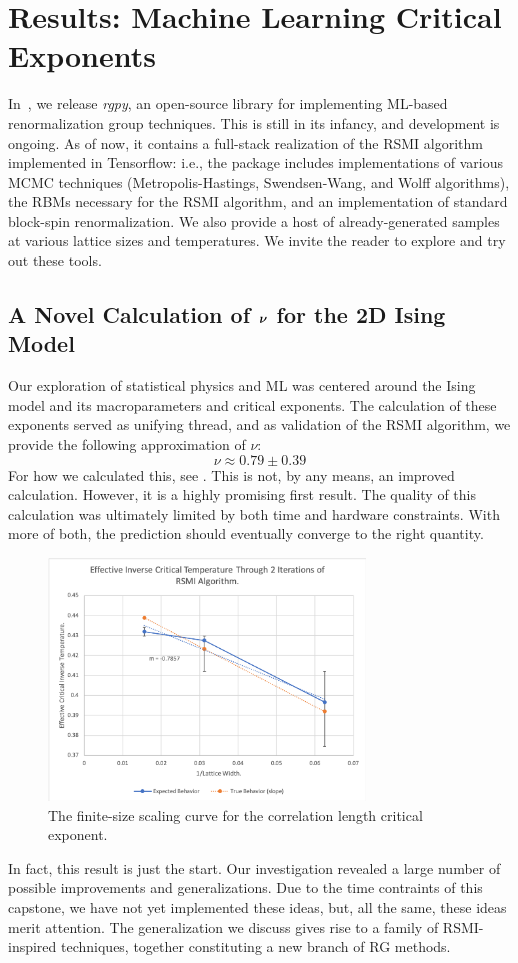 \chapter{Results: Machine Learning Critical Exponents}\label{sec:validation}
In~\cite{rgpy}, we release \textit{rgpy}, an open-source library for
implementing ML-based renormalization group techniques. This is still
in its infancy, and development is ongoing. As of now, it contains a
full-stack realization of the RSMI algorithm implemented in
Tensorflow: i.e., the package includes implementations of various MCMC
techniques (Metropolis-Hastings, Swendsen-Wang, and Wolff algorithms),
the RBMs necessary for the RSMI algorithm, and an implementation of
standard block-spin renormalization. We also provide a host of
already-generated samples at various lattice sizes and
temperatures. We invite the reader to explore and try out these tools.

\section{A Novel Calculation of $\boldsymbol{\nu}$ for the 2D Ising Model}
Our exploration of statistical physics and ML was centered around the
Ising model and its macroparameters and critical exponents. The
calculation of these exponents served as unifying thread, and as
validation of the RSMI algorithm, we provide the following approximation
of $\nu$:
\begin{equation}%
  \boxed{\nu\approx 0.79 \pm0.39}
\end{equation}%
For how we calculated this, see
. This is not, by any means, an improved calculation.
However, it is a highly promising first result. The quality of this
calculation was ultimately limited by both time and hardware
constraints. With more of both, the prediction should eventually
converge to the right quantity.
\begin{figure}
  \centering
  \includegraphics[width=0.75\textwidth]{figures/crit-exponent.png}
  \caption{The finite-size scaling curve for the correlation length
    critical exponent.\label{fig:nu} }
\end{figure}
In fact, this result is just the start. Our investigation revealed a
large number of possible improvements and generalizations. Due to the
time contraints of this capstone, we have not yet implemented these
ideas, but, all the same, these ideas merit attention. The
generalization we discuss gives rise to a family of RSMI-inspired
techniques, together constituting a new branch of RG methods.


